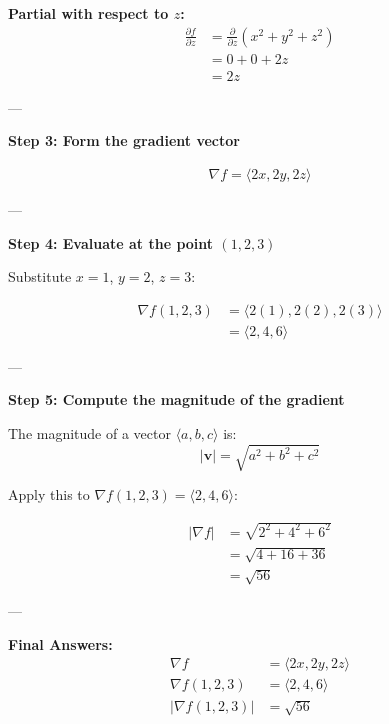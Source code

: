 \begin{examplebox}
    \textbf{Partial with respect to $z$:}
    \begin{align*}
        \frac{\partial f}{\partial z}
         & = \frac{\partial}{\partial z}(x^2 + y^2 + z^2) \\
         & = 0 + 0 + 2z                                   \\
         & = 2z
    \end{align*}

    ---

    \textbf{Step 3: Form the gradient vector}

    \begin{align*}
        \nabla f = \langle 2x, 2y, 2z \rangle
    \end{align*}

    ---

    \textbf{Step 4: Evaluate at the point $(1,2,3)$}

    Substitute $x=1$, $y=2$, $z=3$:

    \begin{align*}
        \nabla f(1,2,3)
         & = \langle 2(1), 2(2), 2(3) \rangle \\
         & = \langle 2, 4, 6 \rangle
    \end{align*}

    ---

    \textbf{Step 5: Compute the magnitude of the gradient}

    The magnitude of a vector $\langle a,b,c \rangle$ is:
    \begin{equation*}
        |\mathbf{v}| = \sqrt{a^2 + b^2 + c^2}
    \end{equation*}

    Apply this to $\nabla f(1,2,3) = \langle 2,4,6 \rangle$:

    \begin{align*}
        |\nabla f|
         & = \sqrt{2^2 + 4^2 + 6^2} \\
         & = \sqrt{4 + 16 + 36}     \\
         & = \sqrt{56}
    \end{align*}

    ---

    \textbf{Final Answers:}
    \begin{align*}
        \nabla f          & = \langle 2x,2y,2z \rangle \\
        \nabla f(1,2,3)   & = \langle 2,4,6 \rangle    \\
        |\nabla f(1,2,3)| & = \sqrt{56}
    \end{align*}


\end{examplebox}
